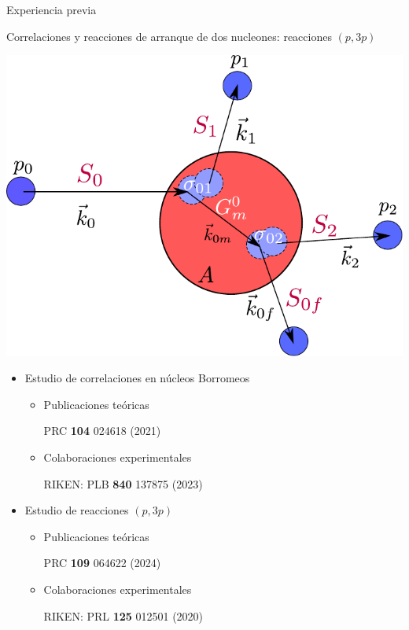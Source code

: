 \documentclass{beamer}
\begin{document}
\begin{frame}{Experiencia previa} 

   \begin{minipage}{0.45\textwidth}
     \tiny Correlaciones y reacciones de arranque de dos nucleones: reacciones $(p,3p)$
    
    \includegraphics[height=0.3\textheight]{model.pdf}
    
    \end{minipage}
    \begin{minipage}{0.45\textwidth}
    \tiny
    \begin{itemize}
    \item Estudio de correlaciones en núcleos Borromeos
    \begin{itemize}
       \tiny
    \item Publicaciones teóricas
    
    PRC \textbf{104} 024618 (2021)
    
    \item Colaboraciones experimentales
    
    RIKEN: PLB \textbf{840} 137875 (2023)
    
    \end{itemize}
    \item Estudio de reacciones $(p,3p)$
    \begin{itemize}
    \tiny
    \item Publicaciones teóricas
    
    PRC \textbf{109} 064622 (2024)
    
    \item Colaboraciones experimentales
    
     RIKEN: PRL \textbf{125} 012501 (2020)   
    
    \end{itemize}
    \end{itemize}
    \end{minipage}
    
\end{frame}
\end{document}
